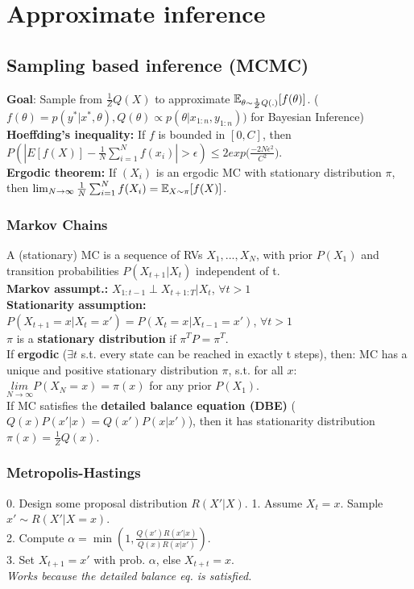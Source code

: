 
\section{Approximate inference}
\subsection{Sampling based inference (MCMC)}
\textbf{Goal}: Sample from $\frac{1}{Z}Q(X)$ to approximate
$\mathbb{E}_{\theta\sim\frac{1}{Z}Q(.)}[f(\theta)]$. ($f(\theta) = p(y^*|x^*,\theta), Q(\theta)\propto p(\theta|x_{1:n},y_{1:n}))$ for Bayesian Inference)\\
\textbf{Hoeffding's inequality:} If $f$ is bounded in $[0, C]$, then
$P(|E[f(X)]-\frac{1}{N}\sum_{i=1}^N f(x_i)| > \epsilon) \leq 2exp\big( \frac{-2N\epsilon^2}{C^2}\big)$.\\
\textbf{Ergodic theorem:} If $(X_i)$ is an ergodic MC with stationary distribution $\pi$, then
$\lim_{N\to\infty}\frac{1}{N}\sum_{i=1}^{N}f(X_i) = \mathbb{E}_{X\sim\pi}[f(X)]$. 

\subsubsection{Markov Chains}
A (stationary) MC is a sequence of RVs $X_1, ..., X_N$, with prior $P(X_1)$ and transition probabilities $P(X_{t+1}|X_t)$ independent of t.\\
\textbf{Markov assumpt.:} $X_{1:t-1}\perp X_{t+1:T}|X_t$, $\forall t>1$\\
\textbf{Stationarity assumption:}\\
$P(X_{t+1}=x|X_t=x')=P(X_{t}=x|X_{t-1}=x')$, $\forall t>1$\\
$\pi$ is a \textbf{stationary distribution} if $\pi^TP = \pi^T$.\\
If \textbf{ergodic} ($\exists t$ s.t. every state can be reached in exactly t steps), then: MC has a unique and positive stationary distribution $\pi$, s.t. for all $x$:\\
            $\underset{N\rightarrow\infty}{lim}P(X_N=x)=\pi(x)$ for any prior $P(X_1)$.\\
If MC satisfies the \textbf{detailed balance equation (DBE)} ($Q(x)P(x'|x)=Q(x')P(x|x')$), then it has stationarity distribution $\pi(x)=\frac{1}{Z}Q(x)$.

\subsubsection{Metropolis-Hastings}
0. Design some proposal distribution $R(X'|X)$.
1. Assume $X_t = x$. Sample $x' \sim R(X'|X=x)$.\\
2. Compute $\alpha = \min(1, \frac{Q(x')R(x'|x)}{Q(x)R(x|x')})$.\\
3. Set $X_{t+1} = x'$ with prob. $\alpha$, else $X_{t+t} = x$.
{\tiny\CircArrowRight{}}\\
\emph{Works because the detailed balance eq. is satisfied.}
